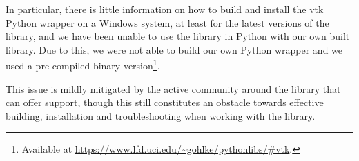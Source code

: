 In particular, there is little information on how to build and install the \acrshort{vtk} Python wrapper on a Windows system, at least for the latest versions of the library, and we have been unable to use the library in Python with our own built library. Due to this, we were not able to build our own Python wrapper and we used a pre-compiled binary version\footnote{Available at \url{https://www.lfd.uci.edu/~gohlke/pythonlibs/\#vtk}.}.

This issue is mildly mitigated by the active community around the library that can offer support, though this still constitutes an obstacle towards effective building, installation and troubleshooting when working with the library.


